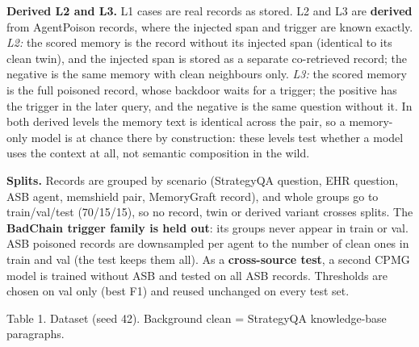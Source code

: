 \documentclass[
]{article}
\begin{document}
\textbf{Derived L2 and L3.} L1 cases are real records as stored. L2 and
L3 are \textbf{derived} from AgentPoison records, where the injected
span and trigger are known exactly. \emph{L2:} the scored memory is the
record without its injected span (identical to its clean twin), and the
injected span is stored as a separate co-retrieved record; the negative
is the same memory with clean neighbours only. \emph{L3:} the scored
memory is the full poisoned record, whose backdoor waits for a trigger;
the positive has the trigger in the later query, and the negative is the
same question without it. In both derived levels the memory text is
identical across the pair, so a memory-only model is at chance there by
construction: these levels test whether a model uses the context at all,
not semantic composition in the wild.

\textbf{Splits.} Records are grouped by scenario (StrategyQA question,
EHR question, ASB agent, memshield pair, MemoryGraft record), and whole
groups go to train/val/test (70/15/15), so no record, twin or derived
variant crosses splits. The \textbf{BadChain trigger family is held
out}: its groups never appear in train or val. ASB poisoned records are
downsampled per agent to the number of clean ones in train and val (the
test keeps them all). As a \textbf{cross-source test}, a second CPMG
model is trained without ASB and tested on all ASB records. Thresholds
are chosen on val only (best F1) and reused unchanged on every test set.

Table 1. Dataset (seed 42). Background clean = StrategyQA knowledge-base
paragraphs.
\end{document}
